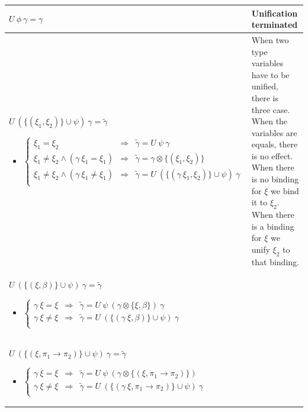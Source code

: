 \documentclass[a4paper]{report}
\newcommand{\bcell}[1]{\begin{minipage}{5cm}#1\end{minipage}}
\newcommand{\scell}[1]{\begin{minipage}{5cm}#1\end{minipage}}
\begin{document}
\begin{table}
\centering
\begin{tabular}{|l|l|}
\hline
\bcell{$U\ \phi\ \gamma = \gamma$}&\scell{Unification terminated}\\
\hline
\bcell{$U\ (\{(\xi_1,\xi_2)\}\cup \psi)\ \gamma=\tilde\gamma$
	\begin{itemize}
	\item $\left\{\begin{array}{ccl}
		\xi_1=\xi_2&\Rightarrow& \tilde\gamma=U\ \psi\ \gamma\\
		\xi_1\neq\xi_2\wedge (\gamma\ \xi_1 = \xi_1)&\Rightarrow& \tilde\gamma=\gamma\otimes\{(\xi_1,\xi_2)\}\\
		\xi_1\neq\xi_2\wedge (\gamma\ \xi_1\neq\xi_1) &\Rightarrow&\tilde\gamma=U\ (\{(\gamma\ \xi_1,\xi_2)\}\cup\psi)\ \gamma\\
		\end{array}\right.$
	\end{itemize}}&\scell{When two type variables have to be unified, there is three case. When the variables are equals, there is no effect. When there is no binding for $\xi$ we bind it to $\xi_2$. When there is a binding for $\xi$ we unify $\xi_2$ to that binding.}\\
\hline
\bcell{$U\ (\{(\xi,\beta)\}\cup\psi)\ \gamma=\tilde\gamma$
	\begin{itemize}
	\item$\left\{\begin{array}{ccl}
		\gamma\ \xi=\xi&\Rightarrow&\tilde\gamma=U\ \psi\ (\gamma\otimes\{\xi,\beta\})\ \gamma\\
		\gamma\ \xi\neq\xi&\Rightarrow&\tilde\gamma= U\ (\{(\gamma\ \xi,\beta)\}\cup\psi)\ \gamma\\
		\end{array}\right.$
	\end{itemize}}&\scell{}\\
\hline
\bcell{$U\ (\{(\xi,\pi_1\to\pi_2)\}\cup\psi)\ \gamma=\tilde\gamma$
	\begin{itemize}
	\item$\left\{\begin{array}{ccl}
		\gamma\ \xi=\xi&\Rightarrow&\tilde\gamma=U\ \psi\ (\gamma\otimes\{(\xi,\pi_1\to\pi_2)\})\\
		\gamma\ \xi\neq\xi&\Rightarrow&\tilde\gamma=U\ (\{(\gamma\ \xi,\pi_1\to\pi_2)\}\cup\psi)\ \gamma\\
		\end{array}\right.$
	\end{itemize}}&\scell{}\\

\end{tabular}
\end{table}
\end{document}
